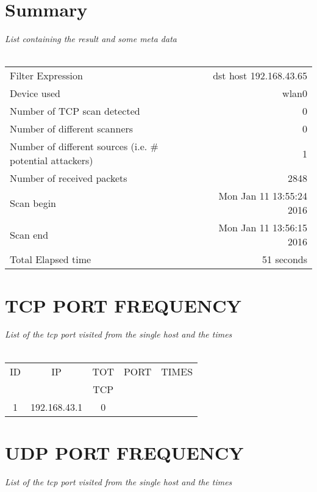 \documentclass[a4paper]{scrartcl}
\begin{document}
\section{Summary}
\emph{List containing the result and some meta data} \\ \\ 
\begin{tabular}{| l | r |}
\hline
Filter Expression & dst host 192.168.43.65 \\ 
Device used & wlan0 \\ 
Number of TCP scan detected & 0 \\ 
Number of different scanners & 0 \\ 
Number of different sources (i.e. \# potential attackers) & 1 \\ 
Number of received packets &  2848 \\ 
Scan begin & Mon Jan 11 13:55:24 2016
 \\ 
Scan end & 	Mon Jan 11 13:56:15 2016
 \\ 
Total Elapsed time & 51 seconds \\ 
\hline
\end{tabular}
\newpage\section{TCP PORT FREQUENCY}
\emph{List of the tcp port visited from the single host and the times} \\ \\ 
\noindent\begin{minipage}[b]{0.5\linewidth}\begin{tabular}{| c | c | c | c | c |}
\hline
ID & IP & TOT & PORT & TIMES \\ 
   &    & TCP &      &       \\ 
\hline
1 & 192.168.43.1 & 0 & & \\ 
\hline
\end{tabular}
\end{minipage}\hfill\newpage\section{UDP PORT FREQUENCY}
\emph{List of the tcp port visited from the single host and the times} \\ \\ 
\end{document}
